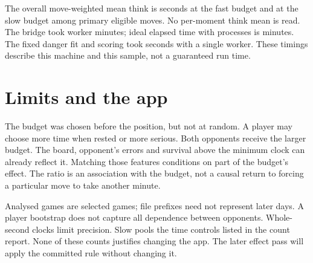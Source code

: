 \documentclass[11pt]{article}
\begin{document}
The overall move-weighted mean think is \FastThink{} seconds at the fast
budget and \SlowThink{} at the slow budget among primary eligible moves.
No per-moment think mean is read. The bridge took \BridgeMinutes{} worker
minutes; ideal elapsed time with \Workers{} processes is
\BridgeTwoMinutes{} minutes. The fixed danger fit and scoring took
\DangerSeconds{} seconds with a single worker. These timings describe this
machine and this sample, not a guaranteed run time.

\section{Limits and the app}
The budget was chosen before the position, but not at random. A player may
choose more time when rested or more serious. Both opponents receive the
larger budget. The board, opponent's errors and survival above the minimum
clock can already reflect it. Matching those features conditions on part
of the budget's effect. The ratio is an association with the budget, not
a causal return to forcing a particular move to take another minute.

Analysed games are selected games; file prefixes need not represent later
days. A player bootstrap does not capture all dependence between opponents.
Whole-second clocks limit precision. Slow pools the time controls listed
in the count report. None of these counts justifies changing the app.
The later effect pass will apply the committed rule without changing it.
\end{document}
